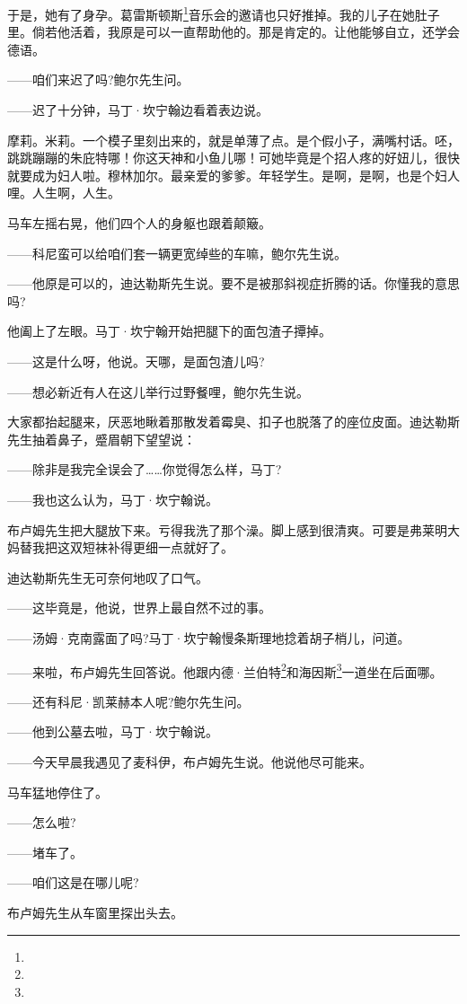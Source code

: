 \par 于是，她有了身孕。葛雷斯顿斯\footnote{}音乐会的邀请也只好推掉。我的儿子在她肚子里。倘若他活着，我原是可以一直帮助他的。那是肯定的。让他能够自立，还学会德语。
\par ——咱们来迟了吗?鲍尔先生问。
\par ——迟了十分钟，马丁·坎宁翰边看着表边说。
\par 摩莉。米莉。一个模子里刻出来的，就是单薄了点。是个假小子，满嘴村话。呸，跳跳蹦蹦的朱庇特哪！你这天神和小鱼儿哪！可她毕竟是个招人疼的好妞儿，很快就要成为妇人啦。穆林加尔。最亲爱的爹爹。年轻学生。是啊，是啊，也是个妇人哩。人生啊，人生。
\par 马车左摇右晃，他们四个人的身躯也跟着颠簸。
\par ——科尼蛮可以给咱们套一辆更宽绰些的车嘛，鲍尔先生说。
\par ——他原是可以的，迪达勒斯先生说。要不是被那斜视症折腾的话。你懂我的意思吗?
\par 他阖上了左眼。马丁·坎宁翰开始把腿下的面包渣子撢掉。
\par ——这是什么呀，他说。天哪，是面包渣儿吗?
\par ——想必新近有人在这儿举行过野餐哩，鲍尔先生说。
\par 大家都抬起腿来，厌恶地瞅着那散发着霉臭、扣子也脱落了的座位皮面。迪达勒斯先生抽着鼻子，蹙眉朝下望望说：
\par ——除非是我完全误会了……你觉得怎么样，马丁?
\par ——我也这么认为，马丁·坎宁翰说。
\par 布卢姆先生把大腿放下来。亏得我洗了那个澡。脚上感到很清爽。可要是弗莱明大妈替我把这双短袜补得更细一点就好了。
\par 迪达勒斯先生无可奈何地叹了口气。
\par ——这毕竟是，他说，世界上最自然不过的事。
\par ——汤姆·克南露面了吗?马丁·坎宁翰慢条斯理地捻着胡子梢儿，问道。
\par ——来啦，布卢姆先生回答说。他跟内德·兰伯特\footnote{}和海因斯\footnote{}一道坐在后面哪。
\par ——还有科尼·凯莱赫本人呢?鲍尔先生问。
\par ——他到公墓去啦，马丁·坎宁翰说。
\par ——今天早晨我遇见了麦科伊，布卢姆先生说。他说他尽可能来。
\par 马车猛地停住了。
\par ——怎么啦?
\par ——堵车了。
\par ——咱们这是在哪儿呢?
\par 布卢姆先生从车窗里探出头去。
